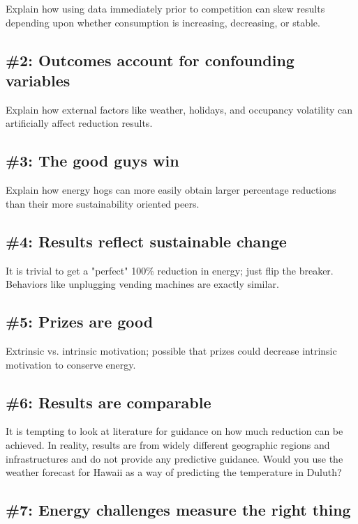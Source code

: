 \documentclass[man]{apa} %
\begin{document}
Explain how using data immediately prior to competition can skew results depending upon
whether consumption is increasing, decreasing, or stable.

\subsection{\#2: Outcomes account for confounding variables}

Explain how external factors like weather, holidays, and occupancy volatility can
artificially affect reduction results.

\subsection{\#3: The good guys win}

Explain how energy hogs can more easily obtain larger percentage reductions than their
more sustainability oriented peers.

\subsection{\#4: Results reflect sustainable change}

It is trivial to get a "perfect" 100\% reduction in energy; just flip the breaker.
Behaviors like unplugging vending machines are exactly similar.

\subsection{\#5: Prizes are good}

Extrinsic vs. intrinsic motivation; possible that prizes could decrease intrinsic
motivation to conserve energy.

\subsection{\#6: Results are comparable}

It is tempting to look at literature for guidance on how much reduction can be achieved.  In reality, results are from widely different geographic regions and infrastructures and do not provide any predictive guidance.  Would you use the weather forecast for Hawaii as a way of predicting the temperature in Duluth?

\subsection{\#7: Energy challenges measure the right thing}
\end{document}
